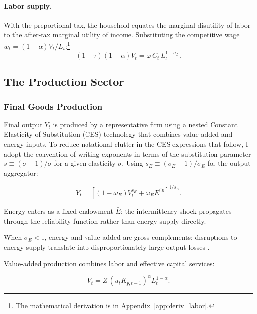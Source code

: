 	\paragraph{Labor supply.} With the proportional tax, the household equates the marginal disutility of labor to the after-tax marginal utility of income. Substituting the competitive wage $w_t = (1-\alpha)V_t/L_t$:\footnote{The mathematical derivation is in Appendix~\ref{app:deriv_labor}.}
	\begin{equation}
		(1-\tau)(1-\alpha) V_t = \varphi \, C_t \, L_t^{1+\sigma_L}
		\label{eq:labor_supply}.
	\end{equation}
	

	
	\subsection{The Production Sector}
	
	\subsubsection{Final Goods Production}
	
	Final output $Y_t$ is produced by a representative firm using a nested Constant Elasticity of Substitution (CES) technology that combines value-added and energy inputs. To reduce notational clutter in the CES expressions that follow, I adopt the convention of writing exponents in terms of the substitution parameter $s \equiv (\sigma - 1)/\sigma$ for a given elasticity $\sigma$. Using $s_E \equiv (\sigma_E - 1)/\sigma_E$ for the output aggregator:
	
	\begin{equation}
		Y_t = \left[(1-\omega_E)V_t^{s_E} + \omega_E \bar{E}^{s_E}\right]^{1/s_E}
		\label{eq:final_output}.
	\end{equation}

Energy enters as a fixed endowment $\bar{E}$; the intermittency shock propagates through the reliability function rather than energy supply directly.
	
	When $\sigma_E < 1$, energy and value-added are gross complements: disruptions to energy supply translate into disproportionately large output losses \citep{heutel2012}.

Value-added production combines labor and effective capital services:
	
	\begin{equation}
		V_t = Z\,(u_t K_{p,t-1})^\alpha L_t^{1-\alpha}
		\label{eq:value_added}.
	\end{equation}
	
